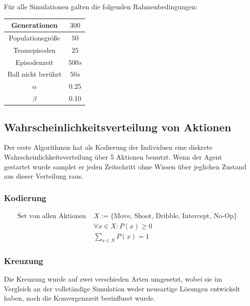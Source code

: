         \noindent
        Für alle Simulationen galten die folgenden Rahmenbedingungen:

        \begin{center}
            \begin{tabular}{ |c|c| } 
                \hline
                Generationen       & $300$  \\ \hline
                Populationsgröße   & $50$   \\ \hline
                Teamepisoden       & $25$   \\ \hline
                Episodenzeit       & $500s$ \\ \hline
                Ball nicht berührt & $50s$  \\ \hline
                $\alpha$           & 0.25   \\ \hline
                $\beta$            & 0.10   \\ \hline
            \end{tabular}
        \end{center}

        \subsection{Wahrscheinlichkeitsverteilung von Aktionen}

            Der erste Algorithmus hat als Kodierung der Individuen eine diskrete Wahrscheinlichkeitsverteilung über 5 Aktionen benutzt. Wenn der Agent gestartet wurde samplet er jeden Zeitschritt ohne Wissen über jeglichen Zustand aus dieser Verteilung raus.

            \subsubsection*{Kodierung}

            \begin{align*}
                \text{Set von allen Aktionen }&X := \{\text{Move, Shoot, Dribble, Intercept, No-Op}\} \\
                &\forall x \in X: P(x) \geq 0 \\
                &\sum_{x \in X}^{} P(x) = 1
            \end{align*}

            \subsubsection*{Kreuzung}
            Die Kreuzung wurde auf zwei verschieden Arten umgesetzt, wobei sie im Vergleich an der vollständige Simulation weder neueartige Lösungen entwickelt haben, noch die Konvergenzzeit beeinflusst wurde.

